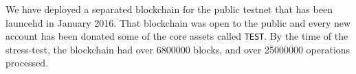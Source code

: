 We have deployed a separated blockchain for the public testnet that has been
launcehd in January 2016. That blockchain was open to the public and every new
account has been donated some of the core assets called \texttt{TEST}. By the
time of the stress-test, the blockchain had over \num{6800000} blocks,
and over \num{25000000} operations processed.
